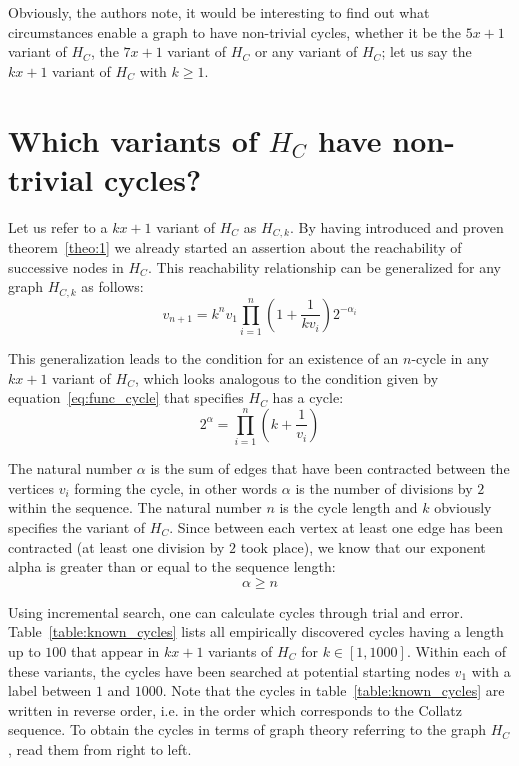 Obviously, the authors note, it would be interesting to find out what circumstances enable a graph to have non-trivial cycles, whether it be the $5x+1$ variant of $H_C$, the $7x+1$ variant of $H_C$ or any variant of $H_C$; let us say the $kx+1$ variant of $H_C$ with $k\geq 1$.

\section{Which variants of \mbox{$H_C$} have non-trivial cycles?}
\label{sec:non_trivial_cycles}
Let us refer to a $kx+1$ variant of $H_C$ as $H_{C,k}$. By having introduced and proven theorem~\ref{theo:1} we already started an assertion about the reachability of successive nodes in $H_C$. This reachability relationship can be generalized for any graph $H_{C,k}$ as follows:
\begin{equation}
\label{eq:generalized_reachability}
v_{n+1}=k^nv_1\prod_{i=1}^{n}\left(1+\frac{1}{kv_{i}}\right)2^{-\alpha_i}
\end{equation}

This generalization leads to the condition for an existence of an $n$-cycle in any $kx+1$ variant of $H_C$, which looks analogous to the condition given by equation~\ref{eq:func_cycle} that specifies $H_C$ has a cycle:
\begin{equation}
\label{eq:generalized_cycle}
2^\alpha=\prod_{i=1}^{n}\left(k+\frac{1}{v_i}\right)
\end{equation}

The natural number $\alpha$ is the sum of edges that have been contracted between the vertices $v_i$ forming the cycle, in other words $\alpha$ is the number of divisions by $2$ within the sequence. The natural number $n$ is the cycle length and $k$ obviously specifies the variant of $H_C$. Since between each vertex at least one edge has been contracted (at least one division by $2$ took place), we know that our exponent alpha is greater than or equal to the sequence length:
\begin{equation}
\label{eq:n_alpha}
	\alpha\ge n
\end{equation}

\par\medskip
Using incremental search, one can calculate cycles through trial and error. Table~\ref{table:known_cycles} lists all empirically discovered cycles having a length up to $100$ that appear in $kx+1$ variants of $H_C$ for $k\in[1,1000]$. Within each of these variants, the cycles have been searched at potential starting nodes $v_1$ with a label between $1$ and $1000$. Note that the cycles in table~\ref{table:known_cycles} are written in reverse order, i.e. in the order which corresponds to the Collatz sequence. To obtain the cycles in terms of graph theory referring to the graph $H_C$, read them from right to left.

